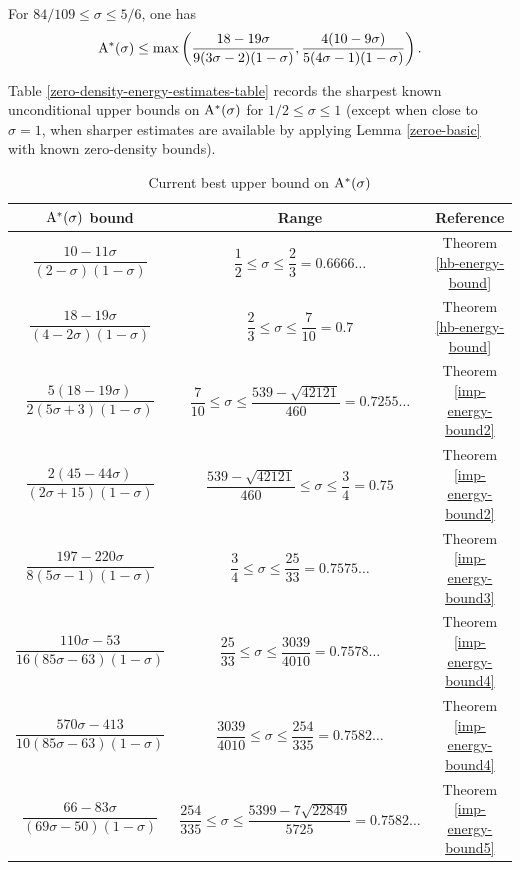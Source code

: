\begin{theorem}\label{imp-energy-bound8}
For $84/109 \le \sigma \le 5/6$, one has 
\[
\mathrm{A}^*(\sigma) \le \max\left(\frac{18 - 19\sigma}{9(3\sigma - 2)(1 - \sigma)}, \frac{4(10 - 9\sigma)}{5(4\sigma - 1)(1 - \sigma)}\right).
\]
\end{theorem}
\derived 
{}



Table \ref{zero-density-energy-estimates-table} records the sharpest known unconditional upper bounds on $\mathrm{A}^*(\sigma)$ for $1/2 \le \sigma \le 1$ (except when close to $\sigma = 1$, when sharper estimates are available by applying Lemma \ref{zeroe-basic} with known zero-density bounds).
\begin{table}[ht]
    \def\arraystretch{2}
    \centering
    \caption{Current best upper bound on $\mathrm{A}^*(\sigma)$}
    \begin{tabular}{|c|c|c|}
    \hline
    $\mathrm{A}^*(\sigma)$ bound & Range & Reference\\
    \hline
    $\dfrac{10 - 11\sigma}{(2 - \sigma)(1 - \sigma)}$ & $\dfrac{1}{2} \leq \sigma \le \dfrac{2}{3} = 0.6666\ldots$ & Theorem \ref{hb-energy-bound}\\
    \hline
    $\dfrac{18 - 19\sigma}{(4 - 2\sigma)(1 - \sigma)}$ & $\dfrac{2}{3} \leq \sigma \le \dfrac{7}{10} = 0.7$ & Theorem \ref{hb-energy-bound}\\
    \hline
    $\dfrac{5(18 - 19\sigma)}{2(5\sigma + 3)(1 - \sigma)}$ & $\dfrac{7}{10} \leq \sigma \le \dfrac{539 - \sqrt{42121}}{460} = 0.7255\ldots$ & Theorem \ref{imp-energy-bound2}\\
    \hline
    $\dfrac{2(45 - 44\sigma)}{(2\sigma + 15)(1 - \sigma)}$ & $\dfrac{539 - \sqrt{42121}}{460} \leq \sigma \le \dfrac{3}{4} = 0.75$ & Theorem \ref{imp-energy-bound2}\\
    \hline
    $\dfrac{197 - 220\sigma}{8(5\sigma - 1)(1 - \sigma)}$ & $\dfrac{3}{4} \leq \sigma \le \dfrac{25}{33} = 0.7575\ldots$ & Theorem \ref{imp-energy-bound3}\\
    \hline
    $\dfrac{110\sigma - 53}{16(85\sigma - 63)(1 - \sigma)}$ & $\dfrac{25}{33} \leq \sigma \le \dfrac{3039}{4010} = 0.7578\ldots$ & Theorem \ref{imp-energy-bound4}\\
    \hline
    $\dfrac{570\sigma - 413}{10(85\sigma - 63)(1 - \sigma)}$ & $\dfrac{3039}{4010} \leq \sigma \le \dfrac{254}{335} = 0.7582\ldots$ & Theorem \ref{imp-energy-bound4}\\
    \hline
    $\dfrac{66 - 83\sigma}{(69\sigma - 50)(1 - \sigma)}$ & $\dfrac{254}{335} \leq \sigma \le \dfrac{5399 - 7\sqrt{22849}}{5725} = 0.7582\ldots$ & Theorem \ref{imp-energy-bound5}\\

\end{tabular}
\end{table}
